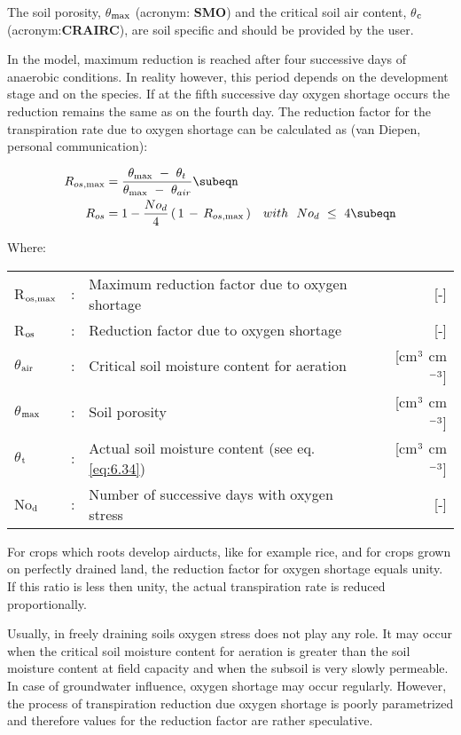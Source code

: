 The soil porosity, {\bf $\theta$$_{{\rm max}}$} (acronym: {\bf SMO}) and the critical soil air 
content, {\bf $\theta$$_{{\rm c}}$} (acronym:{\bf CRAIRC}), are soil specific and should 
be provided by the user. 

In the model, maximum reduction is reached after four successive days of anaerobic
conditions. In reality however, this period depends on the development stage and on the
species. If at the fifth successive day oxygen shortage occurs the reduction remains the
same as on the fourth day. The reduction factor for the transpiration rate due to oxygen
shortage can be calculated as (van Diepen, personal communication):

\begin{align}
\label{eq:6.13a-b}
R_{os,\max } &= \frac{ \theta  _{\max } ~-~ \theta  _{t} }{\theta _{\max } ~-~ \theta  _{air} } \subeqn  \\
R_{os} &= 1 - \frac{No _{d} }{4} \, (\, 1\, -\, R _{os,\max } \, ) ~~~ with~~ No_{d} ~\le ~ 4 \subeqn
\end{align}

Where:\\[5pt]
\begin{tabularx}{\textwidth}{llXr}
 R$_{{\rm os,max}}$ &:& Maximum reduction factor due to oxygen shortage & [-]\\
 R$_{{\rm os}}$ &:& Reduction factor due to oxygen shortage & [-]\\
 $\theta$$_{{\rm air}}$ &:& Critical soil moisture content for aeration 
     & [cm$^{{\rm 3}}$ cm$^{{\rm -3}}$]\\
 $\theta$$_{{\rm max}}$ &:& Soil porosity & [cm$^{{\rm 3}}$ cm$^{{\rm -3}}$]\\
 $\theta$$_{{\rm t}}$ &:& Actual soil moisture content (see eq. \ref{eq:6.34}) 
     & [cm$^{{\rm 3}}$ cm$^{{\rm -3}}$]\\
 No$_{{\rm d}}$ &:& Number of successive days with oxygen stress & [-]\\
\end{tabularx}

For crops which roots develop airducts, like for example rice, and for crops grown on
perfectly drained land, the reduction factor for oxygen shortage equals unity. If this ratio
is less then unity, the actual transpiration rate is reduced proportionally.

Usually, in freely draining soils oxygen stress does not play any role. It may occur when
the critical soil moisture content for aeration is greater than the soil moisture content at
field capacity and when the subsoil is very slowly permeable. In case of groundwater
influence, oxygen shortage may occur regularly. However, the process of transpiration
reduction due oxygen shortage is poorly parametrized and therefore values for the
reduction factor are rather speculative. 

